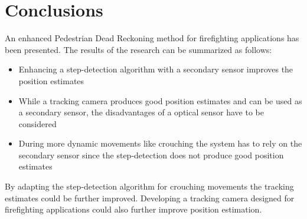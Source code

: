 \documentclass[engproc,conferenceproceedings,submit,pdftex,moreauthors]{Definitions/mdpi}
\begin{document}
\section{Conclusions}

An enhanced Pedestrian Dead Reckoning method for firefighting applications has been presented. The results of the research can be summarized as follows:
\begin{itemize}
	\item Enhancing a step-detection algorithm with a secondary sensor improves the position estimates
	\item While a tracking camera produces good position estimates and can be used as a secondary sensor, the disadvantages of a optical sensor have to be considered
	\item During more dynamic movements like crouching the system has to rely on the secondary sensor since the step-detection does not produce good position estimates
\end{itemize}
By adapting the step-detection algorithm for crouching movements the tracking estimates could be further improved. Developing a tracking camera designed for firefighting applications could also further improve position estimation.
%

\vspace{6pt} 


\end{document}
